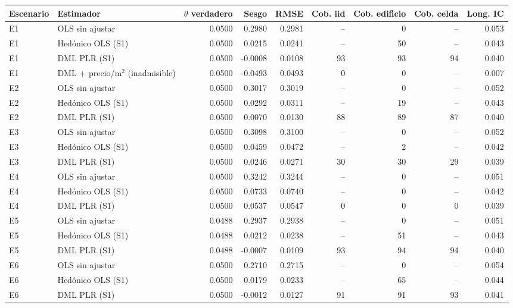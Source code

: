 \begin{tabular}{llrrrrrrr}
\toprule
Escenario & Estimador & $\theta$ verdadero & Sesgo & RMSE & Cob. iid & Cob. edificio & Cob. celda & Long. IC \\
\midrule
E1 & OLS sin ajustar & 0.0500 & 0.2980 & 0.2981 & -- & 0 & -- & 0.053 \\
E1 & Hedónico OLS (S1) & 0.0500 & 0.0215 & 0.0241 & -- & 50 & -- & 0.043 \\
E1 & DML PLR (S1) & 0.0500 & -0.0008 & 0.0108 & 93 & 93 & 94 & 0.040 \\
E1 & DML + precio/m$^2$ (inadmisible) & 0.0500 & -0.0493 & 0.0493 & 0 & 0 & -- & 0.007 \\
E2 & OLS sin ajustar & 0.0500 & 0.3017 & 0.3019 & -- & 0 & -- & 0.052 \\
E2 & Hedónico OLS (S1) & 0.0500 & 0.0292 & 0.0311 & -- & 19 & -- & 0.043 \\
E2 & DML PLR (S1) & 0.0500 & 0.0070 & 0.0130 & 88 & 89 & 87 & 0.040 \\
E3 & OLS sin ajustar & 0.0500 & 0.3098 & 0.3100 & -- & 0 & -- & 0.052 \\
E3 & Hedónico OLS (S1) & 0.0500 & 0.0459 & 0.0472 & -- & 2 & -- & 0.042 \\
E3 & DML PLR (S1) & 0.0500 & 0.0246 & 0.0271 & 30 & 30 & 29 & 0.039 \\
E4 & OLS sin ajustar & 0.0500 & 0.3242 & 0.3244 & -- & 0 & -- & 0.051 \\
E4 & Hedónico OLS (S1) & 0.0500 & 0.0733 & 0.0740 & -- & 0 & -- & 0.042 \\
E4 & DML PLR (S1) & 0.0500 & 0.0537 & 0.0547 & 0 & 0 & 0 & 0.039 \\
E5 & OLS sin ajustar & 0.0488 & 0.2937 & 0.2938 & -- & 0 & -- & 0.051 \\
E5 & Hedónico OLS (S1) & 0.0488 & 0.0212 & 0.0238 & -- & 51 & -- & 0.043 \\
E5 & DML PLR (S1) & 0.0488 & -0.0007 & 0.0109 & 93 & 94 & 94 & 0.040 \\
E6 & OLS sin ajustar & 0.0500 & 0.2710 & 0.2715 & -- & 0 & -- & 0.054 \\
E6 & Hedónico OLS (S1) & 0.0500 & 0.0179 & 0.0233 & -- & 65 & -- & 0.044 \\
E6 & DML PLR (S1) & 0.0500 & -0.0012 & 0.0127 & 91 & 91 & 93 & 0.041 \\
\bottomrule
\end{tabular}